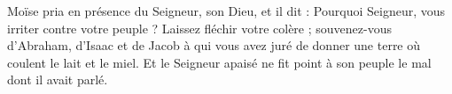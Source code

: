 Moïse pria en présence du Seigneur, son Dieu, et il dit : Pourquoi Seigneur, vous irriter contre votre peuple ? Laissez fléchir votre colère ; souvenez-vous d’Abraham, d’Isaac et de Jacob à qui vous avez juré de donner une terre où coulent le lait et le miel. Et le Seigneur apaisé ne fit point à son peuple le mal dont il avait parlé.
